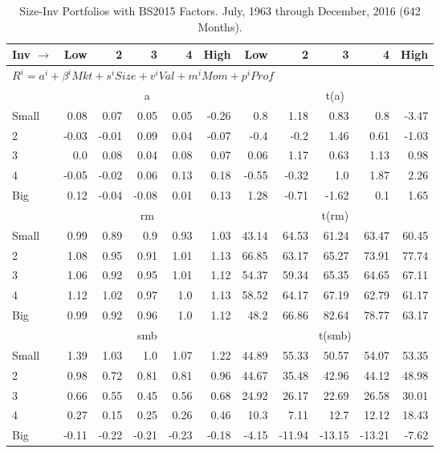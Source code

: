 
\begin{table}[!ht]
\centering
\caption{Size-Inv Portfolios with BS2015 Factors. \footnotesize{July, 1963 through December, 2016 (642 Months).}}
\begin{tabular}{lrrrrrrrrrr}
  \toprule
  Inv $\rightarrow$ & Low & 2 & 3 & 4 & High & Low & 2 & 3 & 4 & High \\ 
  \toprule
  \multicolumn{9}{l}{$R^i=a^i+\beta^iMkt+s^iSize+v^iVal+m^iMom+p^iProf$} \\

  

      & \multicolumn{5}{c}{a} & \multicolumn{5}{c}{t(a)} \\
    \cmidrule(r){2-6} \cmidrule(r){7-11}
      Small  & 0.08  & 0.07  & 0.05  & 0.05  & -0.26   & 0.8  & 1.18  & 0.83  & 0.8  & -3.47  \\
          2  & -0.03  & -0.01  & 0.09  & 0.04  & -0.07   & -0.4  & -0.2  & 1.46  & 0.61  & -1.03  \\
          3  & 0.0  & 0.08  & 0.04  & 0.08  & 0.07   & 0.06  & 1.17  & 0.63  & 1.13  & 0.98  \\
          4  & -0.05  & -0.02  & 0.06  & 0.13  & 0.18   & -0.55  & -0.32  & 1.0  & 1.87  & 2.26  \\
      Big    & 0.12  & -0.04  & -0.08  & 0.01  & 0.13   & 1.28  & -0.71  & -1.62  & 0.1  & 1.65  \\

  

      & \multicolumn{5}{c}{rm} & \multicolumn{5}{c}{t(rm)} \\
    \cmidrule(r){2-6} \cmidrule(r){7-11}
      Small  & 0.99  & 0.89  & 0.9  & 0.93  & 1.03   & 43.14  & 64.53  & 61.24  & 63.47  & 60.45  \\
          2  & 1.08  & 0.95  & 0.91  & 1.01  & 1.13   & 66.85  & 63.17  & 65.27  & 73.91  & 77.74  \\
          3  & 1.06  & 0.92  & 0.95  & 1.01  & 1.12   & 54.37  & 59.34  & 65.35  & 64.65  & 67.11  \\
          4  & 1.12  & 1.02  & 0.97  & 1.0  & 1.13   & 58.52  & 64.17  & 67.19  & 62.79  & 61.17  \\
      Big    & 0.99  & 0.92  & 0.96  & 1.0  & 1.12   & 48.2  & 66.86  & 82.64  & 78.77  & 63.17  \\

  

      & \multicolumn{5}{c}{smb} & \multicolumn{5}{c}{t(smb)} \\
    \cmidrule(r){2-6} \cmidrule(r){7-11}
      Small  & 1.39  & 1.03  & 1.0  & 1.07  & 1.22   & 44.89  & 55.33  & 50.57  & 54.07  & 53.35  \\
          2  & 0.98  & 0.72  & 0.81  & 0.81  & 0.96   & 44.67  & 35.48  & 42.96  & 44.12  & 48.98  \\
          3  & 0.66  & 0.55  & 0.45  & 0.56  & 0.68   & 24.92  & 26.17  & 22.69  & 26.58  & 30.01  \\
          4  & 0.27  & 0.15  & 0.25  & 0.26  & 0.46   & 10.3  & 7.11  & 12.7  & 12.12  & 18.43  \\
      Big    & -0.11  & -0.22  & -0.21  & -0.23  & -0.18   & -4.15  & -11.94  & -13.15  & -13.21  & -7.62  \\


\end{tabular}
\end{table}
